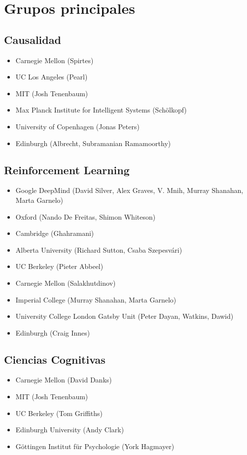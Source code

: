 \documentclass[11pt]{article}
\theoremstyle{plain}
\begin{document}
\section{Grupos principales}
\subsection{Causalidad}
\begin{itemize}
\item Carnegie Mellon (Spirtes)
\item UC Los Angeles (Pearl)
\item MIT (Josh Tenenbaum)
\item Max Planck Institute for Intelligent Systems (Schölkopf)
\item University of Copenhagen  (Jonas Peters)
\item Edinburgh (Albrecht, Subramanian Ramamoorthy)
\end{itemize}
\subsection{Reinforcement Learning}
\begin{itemize}
\item Google DeepMind (David Silver, Alex Graves, V. Mnih, Murray Shanahan, Marta Garnelo)
\item Oxford (Nando De Freitas, Shimon Whiteson)
\item Cambridge (Ghahramani)
\item  Alberta University (Richard Sutton, Csaba Szepesvári)
\item UC Berkeley (Pieter Abbeel)
\item Carnegie Mellon (Salakhutdinov)
\item Imperial College (Murray Shanahan, Marta Garnelo)
\item University College London Gatsby Unit (Peter Dayan, Watkins, Dawid)
\item Edinburgh (Craig Innes)
\end{itemize}
\subsection{Ciencias Cognitivas}
\begin{itemize}
\item Carnegie Mellon (David Danks)
\item MIT (Josh Tenenbaum)
\item UC Berkeley (Tom Griffiths)
\item Edinburgh University (Andy Clark)
\item Göttingen Institut für Psychologie (York Hagmayer)
\end{itemize}


\end{document}
